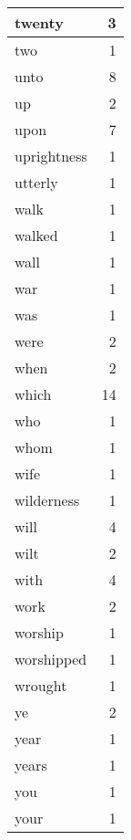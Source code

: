 \begin{center}
\begin{longtable}{l|r}
twenty & 3 \\ \hline
two & 1 \\ \hline
unto & 8 \\ \hline
up & 2 \\ \hline
upon & 7 \\ \hline
uprightness & 1 \\ \hline
utterly & 1 \\ \hline
walk & 1 \\ \hline
walked & 1 \\ \hline
wall & 1 \\ \hline
war & 1 \\ \hline
was & 1 \\ \hline
were & 2 \\ \hline
when & 2 \\ \hline
which & 14 \\ \hline
who & 1 \\ \hline
whom & 1 \\ \hline
wife & 1 \\ \hline
wilderness & 1 \\ \hline
will & 4 \\ \hline
wilt & 2 \\ \hline
with & 4 \\ \hline
work & 2 \\ \hline
worship & 1 \\ \hline
worshipped & 1 \\ \hline
wrought & 1 \\ \hline
ye & 2 \\ \hline
year & 1 \\ \hline
years & 1 \\ \hline
you & 1 \\ \hline
your & 1 \\ \hline
\end{longtable}
\end{center}



\normalsize



